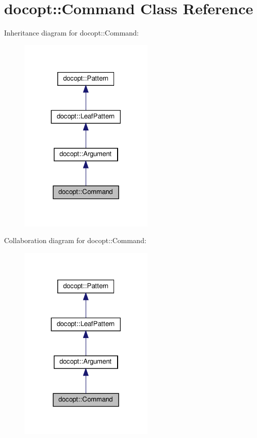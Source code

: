 \hypertarget{classdocopt_1_1Command}{}\section{docopt\+:\+:Command Class Reference}
\label{classdocopt_1_1Command}


Inheritance diagram for docopt\+:\+:Command\+:
\nopagebreak
\begin{figure}[H]
\begin{center}
\leavevmode
\includegraphics[width=182pt]{classdocopt_1_1Command__inherit__graph}
\end{center}
\end{figure}


Collaboration diagram for docopt\+:\+:Command\+:
\nopagebreak
\begin{figure}[H]
\begin{center}
\leavevmode
\includegraphics[width=182pt]{classdocopt_1_1Command__coll__graph}
\end{center}
\end{figure}
